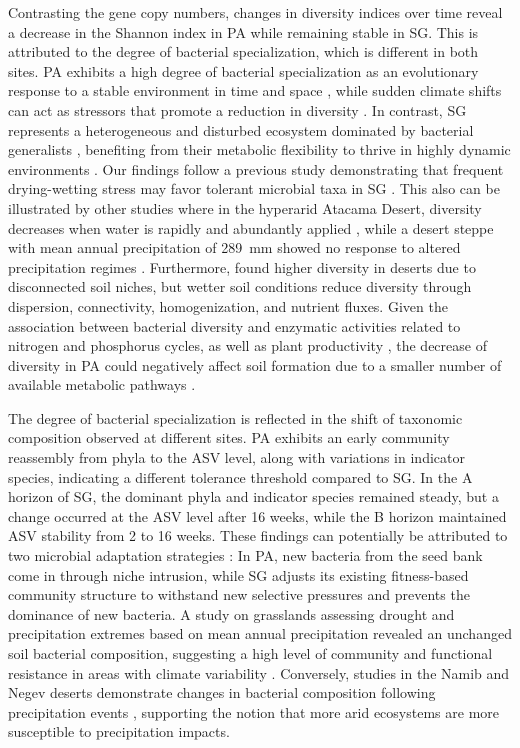Contrasting the gene copy numbers, changes in diversity indices over time reveal a decrease in the Shannon index in PA while remaining stable in SG. This is attributed to the degree of bacterial specialization, which is different in both sites. PA exhibits a high degree of bacterial specialization as an evolutionary response to a stable environment in time and space \citep{Rodriguez2022}, while sudden climate shifts can act as stressors that promote a reduction in diversity \citep{Clavel2011}. In contrast, SG represents a heterogeneous and disturbed ecosystem dominated by bacterial generalists \citep{Rodriguez2022}, benefiting from their metabolic flexibility to thrive in highly dynamic environments \citep{Hawkes2020, ChenNeilson2021}. Our findings follow a previous study demonstrating that frequent drying-wetting stress may favor tolerant microbial taxa in SG \citep{Seuss2022}. This also can be illustrated by other studies where in the hyperarid Atacama Desert, diversity decreases when water is rapidly and abundantly applied \citep{AzuaBustos2018}, while a desert steppe with mean annual precipitation of \SI{289}{\milli\metre} showed no response to altered precipitation regimes \citep{Na2019}. Furthermore, \citet{StovicekB2017} found higher diversity in deserts due to disconnected soil niches, but wetter soil conditions reduce diversity through dispersion, connectivity, homogenization, and nutrient fluxes. Given the association between bacterial diversity and enzymatic activities related to nitrogen and phosphorus cycles, as well as plant productivity \citep{DelgadoBaquerizo2016, Luo2018}, the decrease of diversity in PA could negatively affect soil formation due to a smaller number of available metabolic pathways \citep{Shen2023}.

The degree of bacterial specialization is reflected in the shift of taxonomic composition observed at different sites. PA exhibits an early community reassembly from phyla to the ASV level, along with variations in indicator species, indicating a different tolerance threshold compared to SG. In the A horizon of SG, the dominant phyla and indicator species remained steady, but a change occurred at the ASV level after 16 weeks, while the B horizon maintained ASV stability from 2 to 16 weeks. These findings can potentially be attributed to two microbial adaptation strategies \citep{Uritskiy2019}: In PA, new bacteria from the seed bank come in through niche intrusion, while SG adjusts its existing fitness-based community structure to withstand new selective pressures and prevents the dominance of new bacteria. A study on grasslands assessing drought and precipitation extremes based on mean annual precipitation revealed an unchanged soil bacterial composition, suggesting a high level of community and functional resistance in areas with climate variability \citep{Hawkes2020}. Conversely, studies in the Namib and Negev deserts demonstrate changes in bacterial composition following precipitation events \citep{Armstrong2016, StovicekA2017, Ouyang2020}, supporting the notion that more arid ecosystems are more susceptible to precipitation impacts.

